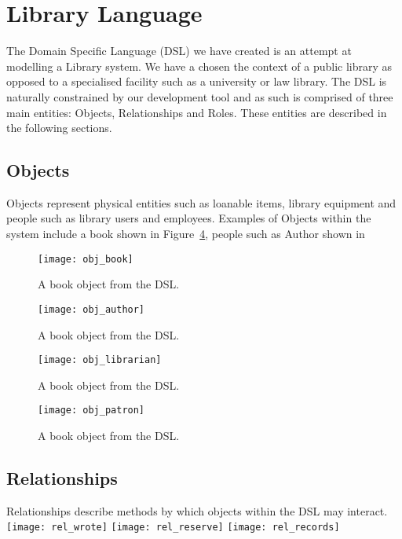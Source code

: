 \section{Library Language}
The Domain Specific Language (DSL) we have created is an attempt at modelling a Library system. We have a chosen the context of a public library as opposed to a specialised facility such as a university or law library. The DSL is naturally constrained by our development tool and as such  is comprised of three main entities: Objects, Relationships and Roles. These entities are described in the following sections. 

\subsection{Objects}
Objects represent physical entities such as loanable items, library equipment and people such as library users and employees. Examples of Objects within the system include a book shown in Figure~\ref{fig:objbook}, people such as Author shown in 

\begin{figure}
  \centering
  \texttt{[image: obj\_book]}  
  \caption{A book object from the DSL.}
  \label{fig:objbook}
\end{figure}

\begin{figure}
  \centering
  \texttt{[image: obj\_author]}
  \caption{A book object from the DSL.}
  \label{fig:objbook}
\end{figure}

\begin{figure}
  \centering
  \texttt{[image: obj\_librarian]}
  \caption{A book object from the DSL.}
  \label{fig:objbook}
\end{figure}

\begin{figure}
  \centering
  \texttt{[image: obj\_patron]}
  \caption{A book object from the DSL.}
  \label{fig:objbook}
\end{figure}







\subsection{Relationships}
Relationships describe methods by which objects within the DSL may interact.
\texttt{[image: rel\_wrote]}
\texttt{[image: rel\_reserve]}
\texttt{[image: rel\_records]}


